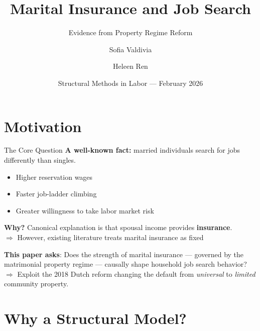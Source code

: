 \documentclass[aspectratio=169, 11pt]{beamer}
\title{\textbf{Marital Insurance and Job Search}}
\subtitle{Evidence from Property Regime Reform}
\author{Sofia Valdivia \and Heleen Ren}
\date{Structural Methods in Labor — February 2026}
\institute{}
\newcommand{\highlight}[1]{\textcolor{blue!80!black}{\textbf{#1}}}
\begin{document}

\maketitle

\section{Motivation}

\begin{frame}{The Core Question}
\textbf{A well-known fact:} married individuals search for jobs differently than singles.
\vspace{0.2em}
\begin{itemize}
  \item Higher reservation wages \citep{GULER2012352}
  \item Faster job-ladder climbing \citep{pilossoph_wee}
  \item Greater willingness to take labor market risk \citep{FERNANDEZBLANCO2022105477}
\end{itemize}
\vspace{1.6em}
\textbf{Why?} 
Canonical explanation is that spousal income provides \highlight{insurance}. \\
$\Rightarrow$ However, existing literature treats marital insurance as fixed
\vspace{2.0em}

\textbf{This paper asks}: Does the strength of marital insurance — governed by the matrimonial property regime — causally shape household job search behavior? \\
$\Rightarrow$ Exploit the 2018 Dutch reform changing the default from \emph{universal} to \emph{limited} community property.

\end{frame}

\section{Why a Structural Model?}
\end{document}
